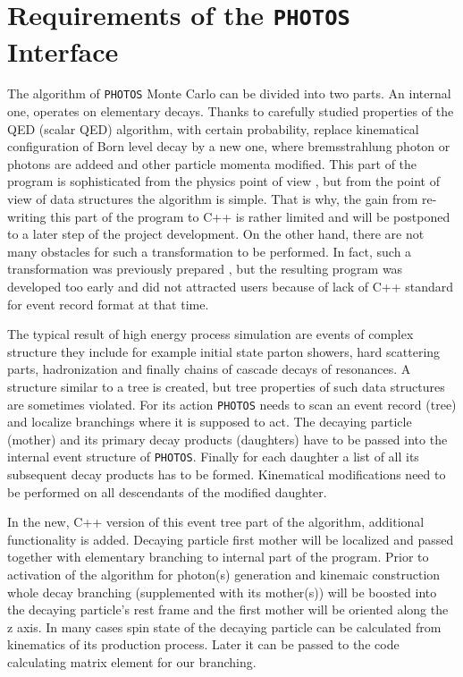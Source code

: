 \documentclass[]{Photos_interface_design}
\begin{document}
\section{Requirements of the {\tt PHOTOS} Interface}
\label{sec:requrements}
The algorithm of {\tt PHOTOS} Monte Carlo can be divided into two parts.
An internal one, operates on elementary decays. Thanks to carefully 
studied properties of the 
QED (scalar QED) algorithm, with certain probability, 
replace  kinematical configuration of Born level decay by a new one, 
where bremsstrahlung photon or photons
are addeed and other particle momenta modified. This part of the program is sophisticated from the physics 
point of view \cite{Nanava:2006vv,Golonka:2006tw},
but from the point of view of data structures the algorithm is simple.
That is why, the gain from re-writing this part of the program to C++ is rather
limited and will be postponed to a later step of the project development.
On the other hand, there are not many obstacles for such a transformation to be
performed. In fact, such a transformation was 
previously prepared \cite{photosplus}, but the resulting program was developed too early 
and did not attracted users because of lack of C++ standard for event record format at that time.

The typical result of high energy process simulation are events of complex structure
they include for example initial state parton showers, hard scattering parts,
hadronization and finally chains of cascade decays of resonances. 
A structure similar to a tree is created, but tree properties of such data structures
are sometimes violated.
For its action {\tt PHOTOS} needs to scan an event record (tree) 
and localize branchings where
it is supposed to act. The decaying particle (mother) and its primary decay products
(daughters) have to be passed into the internal event structure of {\tt PHOTOS}. 
Finally for each daughter a list of all its subsequent decay products has to be 
formed. Kinematical modifications need to be performed on all descendants of the modified daughter.

In the new, C++ version of this event tree part of the algorithm, additional functionality
is added.
Decaying particle first mother will be localized and passed together with  
elementary branching to internal part of the program. 
Prior to activation of the algorithm for  photon(s) generation and kinemaic construction
whole decay branching 
(supplemented with its mother(s))
will be boosted into the decaying particle's rest frame and the first mother
will be oriented along the z axis. 
In many cases spin state of the decaying particle  can be calculated from kinematics of its production process.
Later it can be  passed to the code calculating matrix element for our branching.
\end{document}
